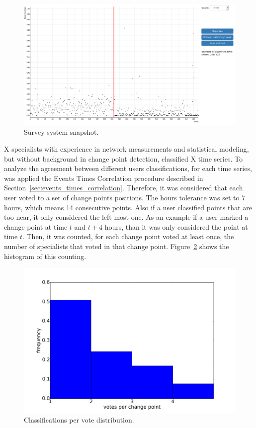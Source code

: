 \begin{figure}[H]
    \centering
    \includegraphics[width=0.9\linewidth]{./figures/methodology/supervised_learning_try/survey_system.png}
    \caption{Survey system snapshot.}
\label{fig:survey_system}
\end{figure}%

X specialists with experience in network measurements and statistical
modeling, but without background in change point detection, classified X time
series.
To analyze the agreement between different users classifications,
for each time series, was applied the Events Times Correlation procedure
described in Section~\ref{sec:events_times_correlation}. Therefore, it was
considered that each user voted to a set of change points positions.
The hours tolerance was set to 7 hours, which means 14 consecutive points. Also
if a user classified points that are too near, it only considered the left most
one. As an example if a user marked a change point at time $t$ and $t + 4$
hours, than it was only considered the point at time $t$.
Then, it
was counted, for each change point voted at least once, the number of
specialists that voted in that change point.
Figure~\ref{fig:classifications_per_vote} shows the histogram of this counting.

\begin{figure}[H]
    \centering
    \includegraphics[width=0.9\linewidth]{./figures/methodology/supervised_learning_try/cnt_classifications_per_vote.png}
    \caption{Classifications per vote distribution.}
\label{fig:classifications_per_vote}
\end{figure}%

